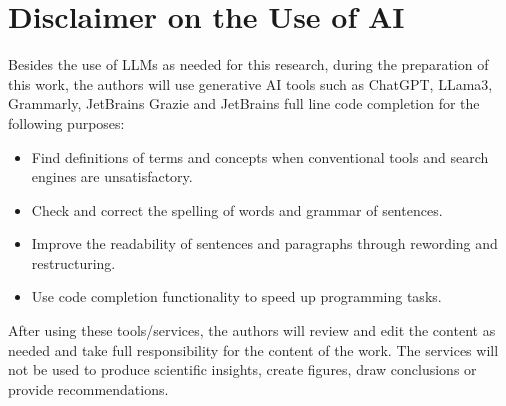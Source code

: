 \section*{Disclaimer on the Use of AI}
\label{sec:disclaimer-use-ai}

Besides the use of LLMs as needed for this research, during the preparation of this work, the authors will use
generative AI tools such as ChatGPT, LLama3, Grammarly, JetBrains Grazie and JetBrains full line code completion for the
following purposes:

\begin{itemize}
    \item Find definitions of terms and concepts when conventional tools and search engines are unsatisfactory.
    \item Check and correct the spelling of words and grammar of sentences.
    \item Improve the readability of sentences and paragraphs through rewording and restructuring.
    \item Use code completion functionality to speed up programming tasks.
\end{itemize}

After using these tools/services, the authors will review and edit the content as needed and take full
responsibility for the content of the work.
The services will not be used to produce scientific insights, create figures, draw conclusions or provide
recommendations.
